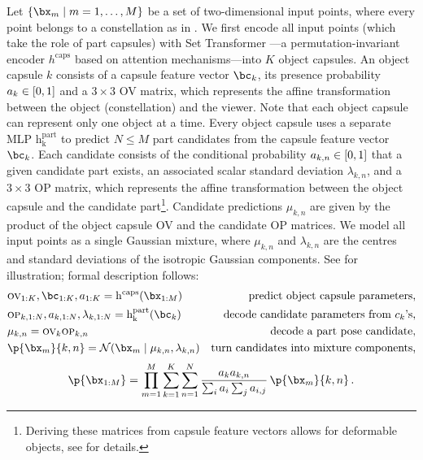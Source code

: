 Let $\set{\bx_m\mid m=1,\dots,M}$ be a set of two-dimensional input points, where every point belongs to a constellation as in .
We first encode all input points (which take the role of part capsules) with Set Transformer \citep{Lee2019set}---a permutation-invariant encoder $h^\mathrm{caps}$ based on attention mechanisms---into $K$ object capsules.
An object capsule $k$ consists of a capsule feature vector $\bc_k$, its presence probability $a_k \in {\left[0, 1\right]}$ and a $3 \times 3$ \gls{OV} matrix, which represents the affine transformation between the object (constellation) and the viewer.
Note that each object capsule can represent only one object at a time.
Every object capsule uses a separate \gls{MLP} $\operatorname{h_k^\mathrm{part}}$ to predict $N \leq M$ part candidates from the capsule feature vector $\bc_k$.
Each candidate consists of the conditional probability $a_{k,n} \in {\left[0, 1\right]}$ that a given candidate part exists, an associated scalar standard deviation $\lambda_{k,n}$, and a $3 \times 3$ \gls{OP} matrix, which represents the affine transformation between the object capsule and the candidate part\footnote{Deriving these matrices from capsule feature vectors allows for deformable objects, see  for details.}.
Candidate predictions $\mu_{k,n}$ are given by the product of the object capsule \gls{OV} and the candidate \gls{OP} matrices.
We model all input points as a single Gaussian mixture, where $\mu_{k,n}$ and $\lambda_{k,n}$ are the centres and standard deviations of the isotropic Gaussian components.
See  for illustration; formal description follows:
\begin{align}
&\textsc{ov}_{1:K}, \bc_{1:K}, a_{1:K} = \operatorname{h^\mathrm{caps}} (\bx_{1:M}) &\text{predict object capsule parameters,} \label{eq:ov}\\
% 
&\textsc{op}_{k,1:N}, a_{k, 1:N}, \lambda_{k, 1:N} = \operatorname{h_k^\mathrm{part}} (\bc_k) &\text{decode candidate parameters from $c_k$'s,} \label{eq:op}\\
% 
&\mu_{k,n} = \textsc{ov}_k \textsc{op}_{k,n} &\text{decode a part pose candidate,} \label{eq:vkn}\\
% 
&\p{\bx_m}{k,n} = \gauss{\bx_m \mid \mu_{k,n}, \lambda_{k,n}} &\text{turn candidates into mixture components,}\label{eq:component}
\end{align}
\begin{equation}
\p{\bx_{1:M}} = \prod_{m=1}^M \sum_{k=1}^K \sum_{n=1}^{N}  
\frac{a_k a_{k,n}}{\sum_i a_i \sum_j a_{i,j}}
\,\p{\bx_m}{k,n}\,. \label{eq:constellation_likelihood}
\end{equation}
